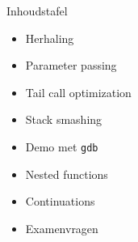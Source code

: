 \documentclass{beamer}
\begin{document}
{
\begin{frame}{Inhoudstafel}
	\begin{itemize}
	    \item Herhaling
	    \item Parameter passing
	    \item Tail call optimization
	    \item Stack smashing
	    \item Demo met \texttt{gdb}
	    \item Nested functions
	    \item Continuations
	    \item Examenvragen
	\end{itemize}
\end{frame}
}
\end{document}
